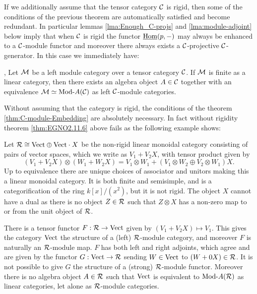 \documentclass{amsart}
\begin{document}
If we additionally assume that the tensor category $\mathcal C$ is rigid, then some of the conditions of the previous theorem are automatically satisfied and become redundant. In particular lemmas \ref{lma:Enough_C-projs} and \ref{lma:module-adjoint} below imply that when $\mathcal C$ is rigid the functor $\operatorname{\underline{Hom}}(p,-)$ may always be enhanced to a $\mathcal C$-module functor and moreover there always exists a $\mathcal C$-projective $\mathcal C$-generator. In this case we immediately have:

\begin{theorem}{\cite[Thm 2.11.6]{EGNO}, \cite[Thm 1]{MR1976459}} \label{thm:EGNO2.11.6}
	Let $\mathcal M$ be a left module category over a tensor category $\mathcal C$. If $\mathcal M$ is finite as a linear category, then there exists an algebra object $A \in \mathcal C$ together with an equivalence $\cM \simeq \Mod{}{A} (\cC)$ as left $\mathcal C$-module categories.
\end{theorem}

Without assuming that the category is rigid, the conditions of the theorem \ref{thm:C-module-Embedding} are absolutely necessary. In fact without rigidity theorem \ref{thm:EGNO2.11.6} above fails as the following example shows: 

\begin{example} \label{ex:lax-module}
	Let $\mathcal R \cong \mathrm{Vect} \oplus \mathrm{Vect} \cdot X$ be the non-rigid linear monoidal category consisting of pairs of vector spaces, which we write as $V_1 + V_2 X$, with tensor product given by 
	\begin{equation*}
		(V_1 + V_2 X) \otimes (W_1 + W_2 X) = V_1 \otimes W_1  +  (V_1 \otimes W_2 \oplus V_2 \otimes W_1)X.
	\end{equation*} 
	Up to equivalence there are unique choices of associator and unitors making this a linear monoidal category. 
It is both finite and semisimple, and is a categorification of the ring $k[x]/(x^2)$, but it is not rigid. The object $X$ cannot have a dual as there is no object $Z \in \mathcal R$ such that $Z \otimes X$ has a non-zero map to or from the unit object of $\mathcal R$. 
	
	There is a tensor functor $F:\mathcal R \to \mathrm{Vect}$ given by $(V_1 + V_2 X) \mapsto V_1$. This gives the category $\mathrm{Vect}$ the structure of a (left) $\mathcal R$-module category, and moreover $F$ is naturally an $\mathcal R$-module map. $F$ has both left and right adjoints, which agree and are given by the functor $G: \mathrm{Vect} \to \mathcal R$ sending $W \in \mathrm{Vect}$ to $(W + 0 X) \in \mathcal R$. It is not possible to give $G$ the structure of a (strong) $\mathcal R$-module functor. Moreover there is no algebra object $A \in \mathcal R$ such that $\mathrm{Vect}$ is equivalent to $\Mod{}{A}(\cR)$ as linear categories, let alone as $\mathcal R$-module categories. 
\end{example}
\end{document}
